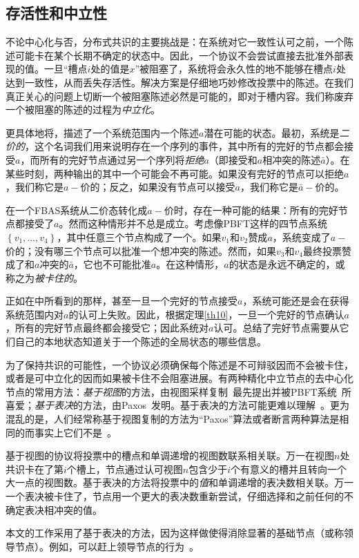 \subsection{存活性和中立性}\label{sec:vote_stuck}

不论中心化与否，分布式共识的主要挑战是：在系统对它一致性认可之前，一个陈述可能卡在某个长期不确定的状态中。因此，一个协议不会尝试直接去批准外部表现的值。一旦``槽点$i$处的值是$x$''被阻塞了，系统将会永久性的地不能够在槽点$i$处达到一致性，从而丢失存活性。解决方案是仔细地巧妙修改投票中的陈述。在我们真正关心的问题上切断一个被阻塞陈述必然是可能的，即对于槽内容。我们称废弃一个被阻塞的陈述的过程为\textit{中立化}。

更具体地将，描述了一个系统范围内一个陈述$a$潜在可能的状态。最初，系统是\textit{二价的}，这个名词我们用来说明存在一个序列的事件，其中所有的完好的节点都会接受$a$，而所有的完好节点通过另一个序列将\textit{拒绝}$a$（即接受和$a$相冲突的陈述$\bar a$）。在某些时刻，两种输出的其中一个可能会不再可能。如果没有完好的节点可以拒绝$a$，我们称它是$a-$价的；反之，如果没有节点可以接受$a$，我们称它是$\bar a-$价的。

在一个FBAS系统从二价态转化成$a-$价时，存在一种可能的结果：所有的完好节点都接受了$a$。然而这种情形并不总是成立。考虑像PBFT这样的四节点系统$\left\{v_1,\ldots,v_4\right\}$，其中任意三个节点构成了一个{\quorum}。如果$v_1$和$v_2$赞成$a$，系统变成了$a-$价的；没有哪三个节点可以批准一个想冲突的陈述。然而，如果$v_3$和$v_4$最终投票赞成了和$a$冲突的$\bar a$，它也不可能批准$a$。在这种情形，$a$的状态是永远不确定的，或称之为\textit{被卡住的}。

正如在中所看到的那样，甚至一旦一个完好的节点接受$a$，系统可能还是会在获得系统范围内对$a$的认可上失败。因此，根据定理\ref{th10}，一旦一个完好的节点确认$a$，所有的完好节点最终都会接受它；因此系统对$a$认可。总结了完好节点需要从它们自己的本地状态知道关于一个陈述的全局状态的哪些信息。

为了保持共识的可能性，一个协议必须确保每个陈述是不可辩驳因而不会被卡住，或者是可中立化的因而如果被卡住不会阻塞进展。有两种精化中立节点的去中心化节点的常用方法：\textit{基于视图}的方法，由视图采样复制~\cite{Oki:1988:VRN:62546.62549}最先提出并被PBFT系统~\cite{Castro:1999:PBFT}所喜爱；\textit{基于表决}的方法，由Paxos~\cite{Lamport:1998:PP:279227.279229}发明。基于表决的方法可能更难以理解~\cite{Ongaro:2014:SUC:2643634.2643666}。更为混乱的是，人们经常称基于视图复制的方法为``Paxos''算法或者断言两种算法是相同的而事实上它们不是~\cite{6894199}。

基于视图的协议将投票中的槽点和单调递增的视图数联系相关联。万一在视图$n$处共识卡在了第$i$个槽上，节点通过认可视图$n$包含少于$i$个有意义的槽并且转向一个大一点的视图数。基于表决的方法将投票中的\textit{值}和单调递增的表决数相关联。万一一个表决被卡住了，节点用一个更大的表决数重新尝试，仔细选择和之前任何的不确定表决相冲突的值。

本文的工作采用了基于表决的方法，因为这样做使得消除显著的基础节点（或称领导节点）。例如，可以赶上领导节点的行为~\cite{Lamport:2011:BPR:2075029.2075058}。
